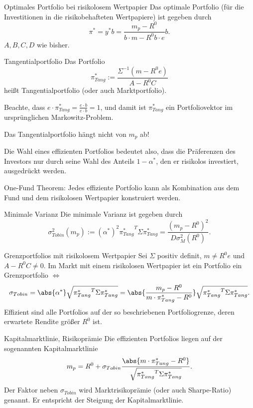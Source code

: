 \begin{karte}{Optimales Portfolio bei risikolosem Wertpapier}
Das optimale Portfolio (für die Investitionen in die risikobehafteten Wertpapiere) ist gegeben durch 
\[ \pi^* = y^* b = \frac{m_p - R^0}{b \cdot m - R^0 b \cdot e} b. \]
\(A, B, C, D\) wie bisher.
\end{karte}

\begin{karte}{Tangentialportfolio}
Das Portfolio 
\[ \pi_{Tang}^* := \frac{ \Sigma^{-1} (m - R^0 e) }{A - R^0 C} \]
heißt Tangentialportfolio (oder auch Marktportfolio).

Beachte, dass \(e \cdot \pi_{Tang}^* = \frac{e \cdot b}{e \cdot b} = 1\), 
und damit ist \(\pi_{Tang}^*\) ein Portfoliovektor im ursprünglichen Markowitz-Problem.

Das Tangentialportfolio hängt nicht von \(m_p\) ab!

Die Wahl eines effizienten Portfolios bedeutet also, dass die Präferenzen des Investors nur durch 
seine Wahl des Anteils \(1-\alpha^*\), den er risikolos investiert, ausgedrückt werden. 

One-Fund Theorem: Jedes effiziente Portfolio kann als Kombination aus dem Fund und dem risikolosen Wertpapier konstruiert werden.
\end{karte}

\begin{karte}{Minimale Varianz}
Die minimale Varianz ist gegeben durch 
\[ \sigma_{Tobin}^2 (m_p) := (\alpha^*)^2 {\pi_{Tang}^*}^T \Sigma \pi_{Tang}^* = 
\frac{(m_p - R^0)^2}{D \sigma_M^2 ( R^0 )}. \]
\end{karte}

\begin{karte}{Grenzportfolios mit risikolosem Wertpapier}
Sei \(\Sigma\) positiv definit, \(m\neq R^0 e\) und \(A - R^0 C \neq 0\). Im Markt 
mit einem risikolosen Wertpapier ist ein Portfolio ein Grenzportfolio \(\Leftrightarrow\)
\[ \sigma_{Tobin} = \abs{\alpha^*} \sqrt{ {\pi_{Tang}^*}^T \Sigma \pi_{Tang}^* } 
= \abs{\frac{m_p - R^0}{m \cdot \pi_{Tang}^* - R^0}} \sqrt{{\pi_{Tang}^*}^T \Sigma \pi_{Tang}^*}. \]
Effizient sind alle Portfolios auf der so beschriebenen Portfoliogrenze, deren erwartete 
Rendite größer \(R^0\) ist.
\end{karte}

\begin{karte}{Kapitalmarktlinie, Risikoprämie}
Die effizienten Portfolios liegen auf der sogenannten Kapitalmarktlinie 
\[ m_p = R^0 + \sigma_{Tobin} \frac{\abs{m \cdot \pi_{Tang}^* - R^0}}{\sqrt{{\pi_{Tang}^*}^T \Sigma \pi_{Tang}^*}}. \]
Der Faktor neben \(\sigma_{Tobin}\) wird Marktrisikoprämie (oder auch Sharpe-Ratio) genannt. 
Er entspricht der Steigung der Kapitalmarktlinie.
\end{karte}

